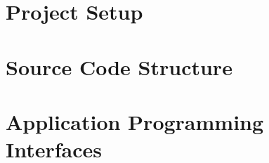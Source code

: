 \section{Project Setup}


\section{Source Code Structure}


\section{Application Programming Interfaces}
